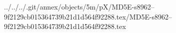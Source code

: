 ../../../.git/annex/objects/5m/pX/MD5E-s8962--9f2129cb015364739b21d1d564f92288.tex/MD5E-s8962--9f2129cb015364739b21d1d564f92288.tex